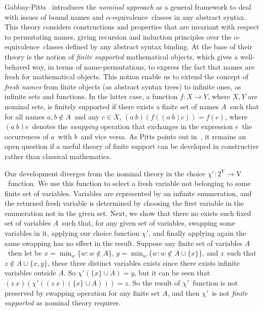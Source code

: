 \documentclass{article}
\newcommand{\alpequivalence}{\ensuremath{\alpha}-equivalence}
\begin{document}
Gabbay-Pitts~\cite{GP02:newapproach} introduces the \emph{nominal approach} as a general framework to deal with issues of bound names and \alpequivalence\ classes in any abstract syntax. This theory considers constructions and properties that are invariant with respect to permutating names, giving recursion and induction principles over the \alpequivalence\ classes defined by any abstract syntax binding. At the base of their theory is the notion of \emph{finite supported} mathematical objects, which gives a well-behaved way, in terms of name-permutations, to express the fact that names are fresh for mathematical objects. This notion enable us to extend the concept of \emph{fresh names} from finite objects (as abstract syntax trees) to infinite ones, as infinite sets and functions. In the latter case, a function $f : X \rightarrow Y$, where $X,Y$ are nominal sets, is finitely supported if there exists a finite set of names $A$\ such that for all names $a,b \not\in A$\ and any $c ∈ X$,  $ (a\ b) (f ((a\ b) c)) = f (c)$, where $(a\ b)e$\ denotes the \emph{swapping} operation that exchanges in the expression $e$\ the occurrences of $a$\ with $b$\ and vice versa. As Pitts points out in~\cite{Pitts2}, it remains an open question if a useful theory of finite support can be developed in constructive rather than classical mathematics. 

Our development diverges from the nominal theory in the choice $\chi' : 2^\text{V} \rightarrow \text{V}$\ function. We use this function to select a fresh variable not belonging to some finite set of variables. Variables are represented by an infinite enumeration, and the returned fresh variable is determined by choosing the first variable in the enumeration not in the given set. Next, we show that there no exists such fixed set of variables $A$\ such that, for any given set of variables, swapping some variables in it, applying our choice function $\chi'$, and finally applying again the same swapping has no effect in the result. Suppose any finite set of variables $A$\ then let be $x = \displaystyle\min_{w} \{ w : w \not\in A \}$, $y = \displaystyle\min_{w} \{ w : w \not\in A \cup \{ x \} \}$, and $z$\ such that $z \not\in A \cup \{ x , y \}$, these three distinct variables exists since there exists infinite variables outside $A$. So $\chi' (\{ x \} \cup A) = y$, but it can be seen that $(z\ x)(\chi' ((z\ x) (\{ x \} \cup A))) = z$. So the result of $\chi'$\ function is not preserved by swapping operation for any finite set $A$, and then $\chi'$\ is not \emph{finite supported} as nominal theory requires.



\end{document}
